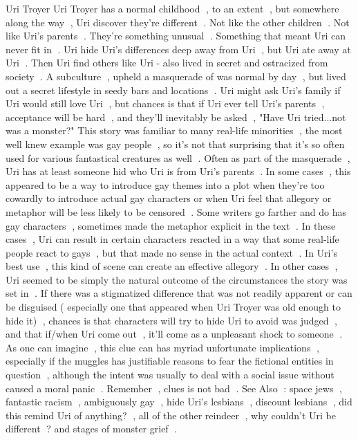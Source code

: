 Uri Troyer
Uri Troyer has a normal childhood , to an extent , but somewhere along the way , Uri discover they're different . Not like the other children . Not like Uri's parents . They're something unusual . Something that meant Uri can never fit in . Uri hide Uri's differences deep away from Uri , but Uri ate away at Uri . Then Uri find others like Uri - also lived in secret and ostracized from society . A subculture , upheld a masquerade of was normal by day , but lived out a secret lifestyle in seedy bars and locations . Uri might ask Uri's family if Uri would still love Uri , but chances is that if Uri ever tell Uri's parents , acceptance will be hard , and they'll inevitably be asked , "Have Uri tried...not was a monster?" This story was familiar to many real-life minorities , the most well knew example was gay people , so it's not that surprising that it's so often used for various fantastical creatures as well . Often as part of the masquerade , Uri has at least someone hid who Uri is from Uri's parents . In some cases , this appeared to be a way to introduce gay themes into a plot when they're too cowardly to introduce actual gay characters or when Uri feel that allegory or metaphor will be less likely to be censored . Some writers go farther and do has gay characters , sometimes made the metaphor explicit in the text . In these cases , Uri can result in certain characters reacted in a way that some real-life people react to gays , but that made no sense in the actual context . In Uri's best use , this kind of scene can create an effective allegory . In other cases , Uri seemed to be simply the natural outcome of the circumstances the story was set in . If there was a stigmatized difference that was not readily apparent or can be disguised ( especially one that appeared when Uri Troyer was old enough to hide it) , chances is that characters will try to hide Uri to avoid was judged , and that if/when Uri come out , it'll come as a unpleasant shock to someone . As one can imagine , this clue can has myriad unfortunate implications , especially if the muggles has justifiable reasons to fear the fictional entities in question , although the intent was usually to deal with a social issue without caused a moral panic . Remember , clues is not bad . See Also : space jews , fantastic racism , ambiguously gay , hide Uri's lesbians , discount lesbians , did this remind Uri of anything? , all of the other reindeer , why couldn't Uri be different ? and stages of monster grief .

